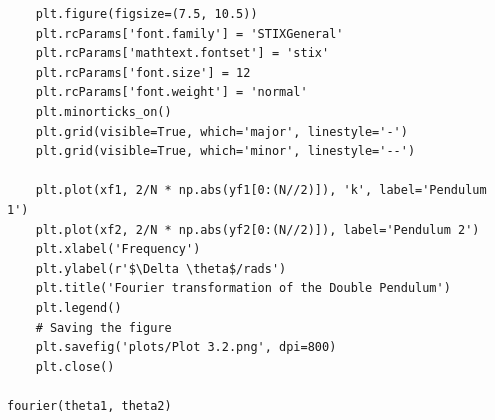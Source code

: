 \documentclass[12pt, a4paper]{article}
\begin{document}
\begin{verbatim}
    plt.figure(figsize=(7.5, 10.5))
    plt.rcParams['font.family'] = 'STIXGeneral'
    plt.rcParams['mathtext.fontset'] = 'stix'
    plt.rcParams['font.size'] = 12
    plt.rcParams['font.weight'] = 'normal'
    plt.minorticks_on()
    plt.grid(visible=True, which='major', linestyle='-')
    plt.grid(visible=True, which='minor', linestyle='--')

    plt.plot(xf1, 2/N * np.abs(yf1[0:(N//2)]), 'k', label='Pendulum 1')
    plt.plot(xf2, 2/N * np.abs(yf2[0:(N//2)]), label='Pendulum 2')
    plt.xlabel('Frequency')
    plt.ylabel(r'$\Delta \theta$/rads')
    plt.title('Fourier transformation of the Double Pendulum')
    plt.legend()
    # Saving the figure
    plt.savefig('plots/Plot 3.2.png', dpi=800)
    plt.close()

fourier(theta1, theta2)

\end{verbatim}
\end{document}

